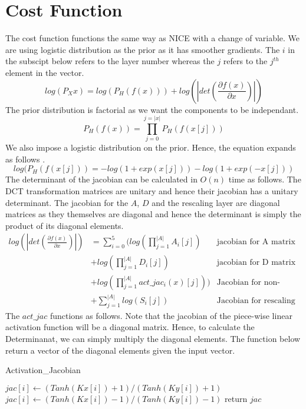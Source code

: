 \documentclass{article}
\begin{document}
\section{Cost Function}
The cost function functions the same way as NICE with a change of variable. We are using logistic distribution as the prior as it has smoother gradients. The $i$ in the subscipt below refers to the layer number whereas the $j$ refers to the $j^{th}$ element in the vector.
$$log(P_X{x}) = log(P_H(f(x))) + log(|det(\frac{\partial f(x)}{\partial x})|)$$
The prior distribution is factorial as we want the components to be independant.
  $$ P_H(f(x)) = \prod_{j=0}^{j=|x|} P_H(f(x[j]))$$
We also impose a logistic distribution on the prior. Hence, the equation expands as follows .
$$ log(P_H(f(x[j])) = -log(1+exp(x[j])) - log(1+exp(-x[j])) $$
The determinant of the jacobian can be calculated in $O(n)$ time as follows. The DCT transformation matrices are unitary and hence their jacobian has a unitary determinant. The jacobian for the $A$, $D$ and the rescaling layer are diagonal matrices as they themselves are diagonal and hence the determinant is simply the product of its diagonal elements.
\begin{align*}
  log(|det(\frac{\partial f(x)}{\partial x})|)  &=  \sum_{i=0}^5 (log(\prod_{j=1}^{|A|} A_i[j])  &\text{jacobian for A matrix}\\
& + log(\prod_{j=1}^{|A|} D_i[j]) & \text{jacobian for D matrix}\\ 
& + log(\prod_{j=1}^{|A|} act\_jac_i(x)[j]))  & \text{Jacobian for non-linearity}\\
& + \sum_{j=1}^{|A|} log(S_i[j]) & \text{Jacobian for rescaling}
\end{align*}
 The $act\_jac$ functions as follows. Note that the jacobian of the piece-wise linear activation function will be a diagonal matrix. Hence, to calculate the Determinanat, we can simply multiply the diagonal elements. The function below return a vector of the diagonal elements given the input vector. 
\begin{algorithm}
  \caption{Activation\_Jacobian}\label{jac}
  \begin{algorithmic}[1]
     
    \State $jac[i]  \gets (Tanh(Kx[i])+1)/(Tanh(Ky[i])+1)   $
    \Else 
    \State $jac[i]  \gets (Tanh(Kx[i])-1)/(Tanh(Ky[i])-1) $
    \EndIf
    \EndFor
    \State return $jac$
    \EndProcedure
  \end{algorithmic}
\end{algorithm}
\end{document}
